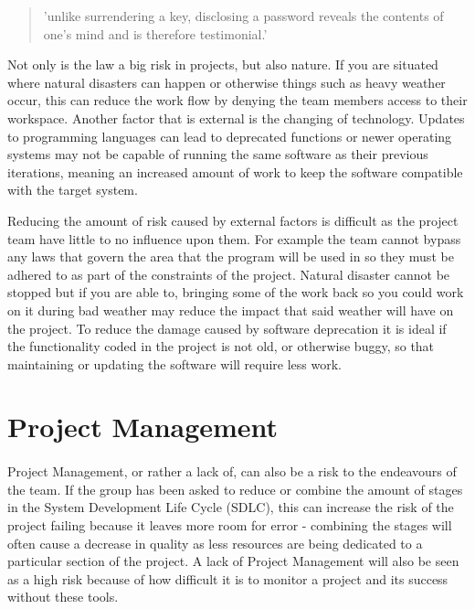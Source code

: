 \begin{quote}
'unlike surrendering a key, disclosing a password reveals the contents of one’s mind and
is therefore testimonial.' \cite{usCryptLaw}
\end{quote}


Not only is the law a big risk in projects, but also nature.  If you are
situated where natural disasters can happen or otherwise things such as heavy
weather occur, this can reduce the work flow by denying the team members access
to their workspace.  Another factor that is external is the changing of
technology.  Updates to programming languages can lead to deprecated functions
or newer operating systems may not be capable of running the same software as
their previous iterations, meaning an increased amount of work to keep the
software compatible with the target system.

Reducing the amount of risk caused by external factors is difficult as the
project team have little to no influence upon them.  For example the team cannot
bypass any laws that govern the area that the program will be used in so they
must be adhered to as part of the constraints of the project.  Natural disaster
cannot be stopped but if you are able to, bringing some of the work back so you
could work on it during bad weather may reduce the impact that said weather will
have on the project.  To reduce the damage caused by software deprecation it is
ideal if the functionality coded in the project is not old, or otherwise buggy,
so that maintaining or updating the software will require less work.

\section{Project Management}
\paragraph{}

Project Management, or rather a lack of, can also be a risk to the endeavours of
the team.  If the group has been asked to reduce or combine the amount of stages
in the System Development Life Cycle (SDLC), this can increase the risk of the
project failing because it leaves more room for error - combining the stages
will often cause a decrease in quality as less resources are being dedicated to
a particular section of the project.  A lack of Project Management will also be
seen as a high risk because of how difficult it is to monitor a project and its
success without these tools.

